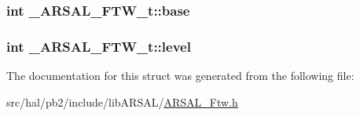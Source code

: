 \subsubsection[{\texorpdfstring{base}{base}}]{\setlength{\rightskip}{0pt plus 5cm}int \+\_\+\+A\+R\+S\+A\+L\+\_\+\+F\+T\+W\+\_\+t\+::base}\hypertarget{struct___a_r_s_a_l___f_t_w__t_a0e6a78ca7030bbaa0e5a057381a6cc7c}{}\label{struct___a_r_s_a_l___f_t_w__t_a0e6a78ca7030bbaa0e5a057381a6cc7c}
\subsubsection[{\texorpdfstring{level}{level}}]{\setlength{\rightskip}{0pt plus 5cm}int \+\_\+\+A\+R\+S\+A\+L\+\_\+\+F\+T\+W\+\_\+t\+::level}\hypertarget{struct___a_r_s_a_l___f_t_w__t_a0c7104a8384913f3cf57ed9abb1e70a6}{}\label{struct___a_r_s_a_l___f_t_w__t_a0c7104a8384913f3cf57ed9abb1e70a6}


The documentation for this struct was generated from the following file\+:\begin{DoxyCompactItemize}
\item 
src/hal/pb2/include/lib\+A\+R\+S\+A\+L/\hyperlink{_a_r_s_a_l___ftw_8h}{A\+R\+S\+A\+L\+\_\+\+Ftw.\+h}\end{DoxyCompactItemize}
